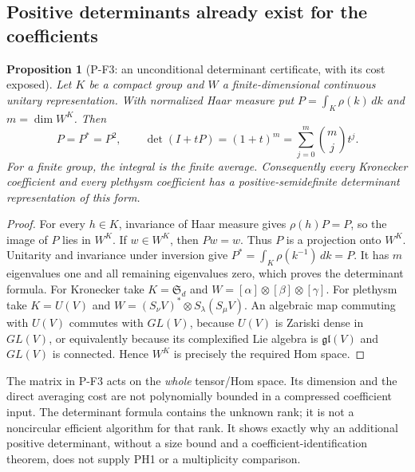\documentclass[11pt,a4paper]{article}
\newtheorem{proposition}{Proposition}[section]
\begin{document}
\subsection{Positive determinants already exist for the coefficients}

\begin{proposition}[P-F3: an unconditional determinant certificate, with its cost exposed]
\label{prop:projector}
Let $K$ be a compact group and $W$ a finite-dimensional continuous
unitary representation. With normalized Haar measure put
$P=\int_K\rho(k)\,dk$ and $m=\dim W^K$. Then
\[
 P=P^*=P^2,\qquad
 \det(I+tP)=(1+t)^m
 =\sum_{j=0}^{m}\binom mj t^j.
\]
For a finite group, the integral is the finite average.
Consequently every Kronecker coefficient and every plethysm coefficient
has a positive-semidefinite determinant representation of this form.
\end{proposition}
\begin{proof}
For every $h\in K$, invariance of Haar measure gives $\rho(h)P=P$,
so the image of $P$ lies in $W^K$. If $w\in W^K$, then $Pw=w$.
Thus $P$ is a projection onto $W^K$.
Unitarity and invariance under inversion give
$P^*=\int_K\rho(k^{-1})\,dk=P$. It has $m$ eigenvalues one
and all remaining eigenvalues zero, which proves the determinant formula.
For Kronecker take $K=\mathfrak S_d$ and
$W=[\alpha]\otimes[\beta]\otimes[\gamma]$.
For plethysm take $K=U(V)$ and
$W=(S_\nu V)^*\otimes S_\lambda(S_\mu V)$.
An algebraic map commuting with $U(V)$ commutes with $GL(V)$, because
$U(V)$ is Zariski dense in $GL(V)$, or equivalently because its complexified
Lie algebra is $\mathfrak{gl}(V)$ and $GL(V)$ is connected.
Hence $W^K$ is precisely the required Hom space.
\end{proof}

The matrix in P-F3 acts on the \emph{whole} tensor/Hom space. Its
dimension and the direct averaging cost are not polynomially bounded
in a compressed coefficient input. The determinant formula contains the
unknown rank; it is not a noncircular efficient algorithm for that rank.
It shows exactly why an additional positive determinant, without a
size bound and a coefficient-identification theorem, does not supply
PH1 or a multiplicity comparison.
\end{document}
